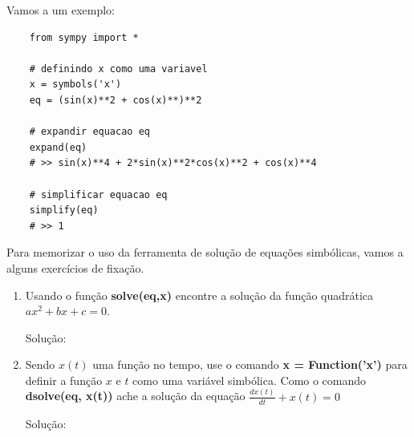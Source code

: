 Vamos a um exemplo:

\begin{lstlisting}
    from sympy import *

    # definindo x como uma variavel
    x = symbols('x')
    eq = (sin(x)**2 + cos(x)**)**2

    # expandir equacao eq
    expand(eq)
    # >> sin(x)**4 + 2*sin(x)**2*cos(x)**2 + cos(x)**4

    # simplificar equacao eq
    simplify(eq)
    # >> 1

\end{lstlisting}

Para memorizar o uso da ferramenta de solução de equações simbólicas, vamos a alguns exercícios de fixação.

\begin{shortbox}
    \begin{enumerate}
        \item  Usando o função \textbf{solve(eq,x)} encontre a solução da função quadrática $ax^2+bx+c=0$.
        \begin{center}
            Solução:

\end{center}

    \item Sendo $x(t)$ uma função no tempo, use o comando \textbf{x = Function('x')} para definir a função $x$ e $t$ como 
    uma variável simbólica. Como o comando \textbf{dsolve(eq, x(t))} ache a solução da equação $\displaystyle\frac{dx(t)}{dt}+x(t)=0$
    \begin{center}
        Solução:

\end{center}

\end{enumerate}
\end{shortbox}



